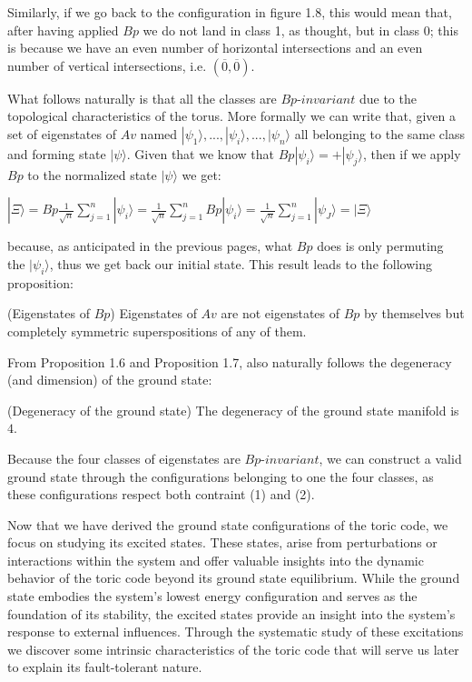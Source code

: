 \documentclass{Configuration_Files/PoliMi3i_thesis}
\begin{document}
Similarly, if we go back to the configuration in figure 1.8, this would mean that, after having applied $Bp$ we do not land in class 1, as thought, but in class 0; this is because we have an even number of horizontal intersections and an even number of vertical intersections, i.e.   $(\overline{0}, \overline{0})$.

What follows naturally is that all the classes are $Bp$-$invariant$ due to the topological characteristics of the torus. More formally we can write that, given a set of eigenstates of $Av$ named $|\psi_1\rangle,...,|\psi_i\rangle,...,|\psi_n\rangle$ all belonging to the same class and forming state $|\psi\rangle$. Given that we know that $Bp|\psi_i\rangle=+|\psi_j\rangle$, then if we apply $Bp$ to the normalized state $|\psi\rangle$ we get:

\begin{center}
	$|\Xi\rangle= Bp \frac{1}{\sqrt{n}} \sum_{j=1}^{n} |\psi_i\rangle = \frac{1}{\sqrt{n}} \sum_{j=1}^{n} Bp |\psi_i\rangle = \frac{1}{\sqrt{n}} \sum_{j=1}^{n} |\psi_J\rangle =|\Xi\rangle$
\end{center}

because, as anticipated in the previous pages, what $Bp$ does is only permuting the $|\psi_i\rangle$, thus we get back our initial state. This result leads to the following proposition:

\begin{proposition}(Eigenstates of $Bp$) Eigenstates of $Av$ are not eigenstates of $Bp$ by themselves but completely symmetric superspositions of any of them.
\end{proposition}

From Proposition 1.6 and Proposition 1.7, also naturally follows the degeneracy (and dimension) of the ground state: \newline

\begin{proposition} (Degeneracy of the ground state) The degeneracy of the ground state manifold is $4$. 
\end{proposition}

Because the four classes of eigenstates are $Bp$-$invariant$, we can construct a valid ground state through the configurations belonging to one the four classes, as these configurations respect both contraint (1) and (2).\newline 

Now that we have derived the ground state configurations of the toric code, we focus on studying its excited states. These states, arise from perturbations or interactions within the system and offer valuable insights into the dynamic behavior of the toric code beyond its ground state equilibrium. While the ground state embodies the system's lowest energy configuration and serves as the foundation of its stability, the excited states provide an insight into the system's response to external influences. 
Through the systematic study of these excitations we discover some intrinsic characteristics of the toric code that will serve us later to explain its fault-tolerant nature.
\end{document}
